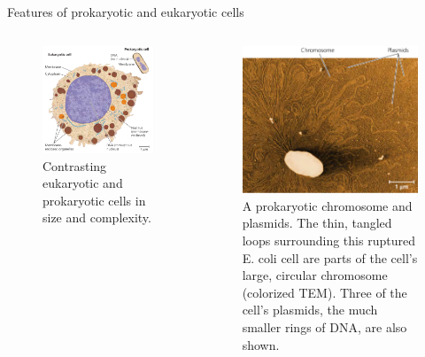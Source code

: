 \documentclass[
  ignorenonframetext,
  aspectratio=169]{beamer}
\begin{document}
\begin{frame}{Features of prokaryotic and eukaryotic cells}
\protect\hypertarget{features-of-prokaryotic-and-eukaryotic-cells-1}{}
\begin{columns}[T,onlytextwidth]
  
\begin{figure}
\includegraphics[width=0.7\linewidth]{./../images/eukaryotic_prokaryotic} \caption{Contrasting eukaryotic and prokaryotic cells in size and complexity.}\label{fig:eu-prokaryotic-cell}
\end{figure}


\begin{figure}
\includegraphics[width=0.75\linewidth]{./../images/prokaryotic_chr_plasmid} \caption{A prokaryotic chromosome and plasmids. The thin, tangled loops surrounding this ruptured E. coli cell are parts of the cell’s large, circular chromosome (colorized TEM). Three of the cell’s plasmids, the much smaller rings of DNA, are also shown.}\label{fig:prokaryotic-dna}
\end{figure}

\end{columns}
\end{frame}
\end{document}
